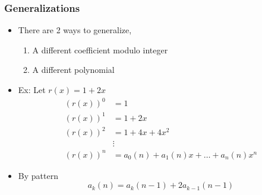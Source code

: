 \documentclass{beamer}
\begin{document}
\begin{frame}
    \frametitle{Generalizations}
    \begin{itemize}
        \item There are 2 ways to generalize,
        \begin{enumerate}
            \item A different coefficient modulo integer 
            \item A different polynomial
        \end{enumerate}
        \item Ex: Let $r(x) = 1+2x$
        \begin{align*}
            (r(x))^0 &= 1 \\
            (r(x))^1 &= 1+2x \\
            (r(x))^2 &= 1 + 4x + 4x^2\\
            &\vdots \\
            (r(x))^n &= a_0(n) + a_1(n)x + \dots + a_n(n)x^n
        \end{align*}
        \item By pattern
        \begin{equation*}
            a_k(n) = a_{k}(n-1) + 2a_{k-1}(n-1)
        \end{equation*}
    \end{itemize}
\end{frame}
\end{document}

